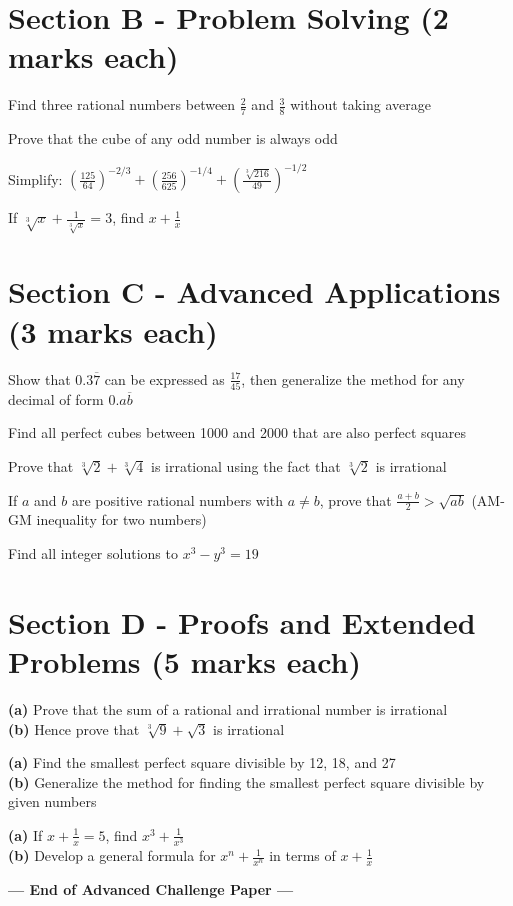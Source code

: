 \documentclass[11pt,a4paper]{exam}
\begin{document}
	\section*{Section B - Problem Solving (2 marks each)}
	\begin{questions}
		\question Find three rational numbers between $\frac{2}{7}$ and $\frac{3}{8}$ without taking average
		
		\question Prove that the cube of any odd number is always odd
		
		\question Simplify: $\left(\frac{125}{64}\right)^{-2/3} + \left(\frac{256}{625}\right)^{-1/4} + \left(\frac{\sqrt[3]{216}}{49}\right)^{-1/2}$
		
		\question If $\sqrt[3]{x} + \frac{1}{\sqrt[3]{x}} = 3$, find $x + \frac{1}{x}$
	\end{questions}
	
	\section*{Section C - Advanced Applications (3 marks each)}
	\begin{questions}
		\question Show that $0.3\overline{7}$ can be expressed as $\frac{17}{45}$, then generalize the method for any decimal of form $0.a\overline{b}$
		
		\question Find all perfect cubes between 1000 and 2000 that are also perfect squares
		
		\question Prove that $\sqrt[3]{2} + \sqrt[3]{4}$ is irrational using the fact that $\sqrt[3]{2}$ is irrational
		
		\question If $a$ and $b$ are positive rational numbers with $a \neq b$, prove that $\frac{a+b}{2} > \sqrt{ab}$ (AM-GM inequality for two numbers)
		
		\question Find all integer solutions to $x^3 - y^3 = 19$
	\end{questions}
	
	\section*{Section D - Proofs and Extended Problems (5 marks each)}
	\begin{questions}
		\question \textbf{(a)} Prove that the sum of a rational and irrational number is irrational \\
		\textbf{(b)} Hence prove that $\sqrt[3]{9} + \sqrt{3}$ is irrational
		
		\question \textbf{(a)} Find the smallest perfect square divisible by 12, 18, and 27 \\
		\textbf{(b)} Generalize the method for finding the smallest perfect square divisible by given numbers
		
		\question \textbf{(a)} If $x + \frac{1}{x} = 5$, find $x^3 + \frac{1}{x^3}$ \\
		\textbf{(b)} Develop a general formula for $x^n + \frac{1}{x^n}$ in terms of $x + \frac{1}{x}$
	\end{questions}
	
	\begin{center}
		\textbf{--- End of Advanced Challenge Paper ---}
	\end{center}
	
\end{document}
